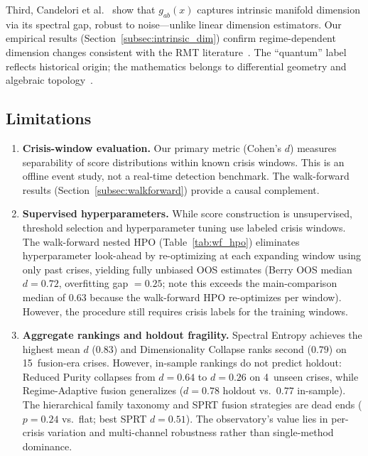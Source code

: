 \documentclass[3p]{elsarticle}
\begin{document}
Third, Candelori et al.~\cite{candelori2025} show that $g_{ab}(x)$
captures intrinsic manifold dimension via its spectral gap, robust to
noise---unlike linear dimension estimators.  Our empirical results
(Section~\ref{subsec:intrinsic_dim}) confirm regime-dependent dimension
changes consistent with the RMT literature~\cite{laloux1999,bai_ng2002}.
The ``quantum'' label reflects historical origin; the mathematics belongs
to differential geometry and algebraic
topology~\cite{schuld_killoran2019,busemeyer2012}.

\subsection{Limitations}

\begin{enumerate}
\item \textbf{Crisis-window evaluation.}  Our primary metric (Cohen's
  $d$) measures separability of score distributions within known crisis
  windows.  This is an offline event study, not a real-time detection
  benchmark.  The walk-forward results
  (Section~\ref{subsec:walkforward}) provide a causal complement.

\item \textbf{Supervised hyperparameters.}  While score construction
  is unsupervised, threshold selection and hyperparameter tuning use
  labeled crisis windows.  The walk-forward nested HPO
  (Table~\ref{tab:wf_hpo}) eliminates hyperparameter look-ahead
  by re-optimizing at each expanding window using only past crises,
  yielding fully unbiased OOS estimates (Berry OOS median $d = 0.72$,
  overfitting gap $= 0.25$; note this exceeds the main-comparison
  median of $0.63$ because the walk-forward HPO re-optimizes per
  window).  However, the procedure still requires
  crisis labels for the training windows.

\item \textbf{Aggregate rankings and holdout fragility.}
  Spectral Entropy achieves the highest mean $d$ ($0.83$) and
  Dimensionality Collapse ranks second ($0.79$) on 15~fusion-era
  crises.  However, in-sample rankings do not predict holdout:
  Reduced Purity collapses from $d = 0.64$ to $d = 0.26$ on
  4~unseen crises, while Regime-Adaptive fusion generalizes
  ($d = 0.78$ holdout vs.\ $0.77$ in-sample).  The hierarchical
  family taxonomy and SPRT fusion strategies are dead ends
  ($p = 0.24$ vs.\ flat; best SPRT $d = 0.51$).  The observatory's
  value lies in per-crisis variation and multi-channel
  robustness rather than single-method dominance.


\end{enumerate}
\end{document}
